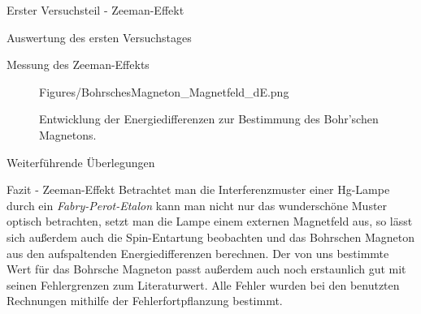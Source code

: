 \documentclass[pdftex, a4paper,11pt, twoside, ngerman]{report}
\begin{document}
\begin{chapter}{Erster Versuchsteil - Zeeman-Effekt}
\begin{section}{Auswertung des ersten Versuchstages}
\begin{subsection}{Messung des Zeeman-Effekts}
\begin{figure}[ht]
              {Figures/BohrschesMagneton_Magnetfeld_dE.png}
          \caption{Entwicklung der Energiedifferenzen zur Bestimmung des
              Bohr'schen Magnetons.}
          \label{fig:BohrschesMagneton}
        \end{figure}
        
      \end{subsection}
      
      
      
      \begin{subsection}{Weiterführende Überlegungen}
        \label{chp:Zeeman:sec:AuswertungWeiteres}
        
        
      \end{subsection}
      
    \end{section}
    
    
    
    \begin{section}{Fazit - Zeeman-Effekt}
      \label{chp:ZeemanEffekt:sec:Fazit}
      Betrachtet man die Interferenzmuster einer Hg-Lampe durch ein
      \textit{Fabry-Perot-Etalon} kann man nicht nur das wunderschöne Muster
      optisch betrachten, setzt man die Lampe einem externen Magnetfeld aus,
      so lässt sich außerdem auch die Spin-Entartung
      beobachten und das Bohrschen Magneton aus den aufspaltenden
      Energiedifferenzen berechnen. Der von uns bestimmte Wert für das Bohrsche
      Magneton passt außerdem auch noch erstaunlich gut mit seinen Fehlergrenzen
      zum Literaturwert.
      Alle Fehler wurden bei den benutzten Rechnungen mithilfe der
      Fehlerfortpflanzung bestimmt.
    \end{section}
    
  \end{chapter}
  
  
  
\end{document}
